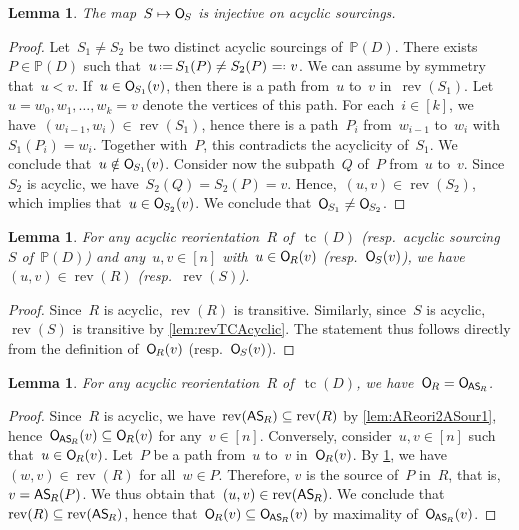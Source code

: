 \documentclass{amsart}
\newtheorem{lemma}[theorem]{Lemma}
\theoremstyle{definition}
\newcommand{\eqdef}{\mbox{\,\raisebox{0.2ex}{\scriptsize\ensuremath{\mathrm:}}\ensuremath{=}\,}} %
\newcommand{\defeq}{\mbox{~\ensuremath{=}\raisebox{0.2ex}{\scriptsize\ensuremath{\mathrm:}} }} %
\DeclareMathOperator{\tc}{tc} %
\newcommand{\mymap}[2]{\mathsf{#1}_{\hspace{-.7pt}#2}}
\newcommand{\orn}[1]{\mymap{O}{#1}}  %
\DeclareMathOperator{\rev}{rev} %
\newcommand{\asour}[1]{\mymap{AS}{#1}}  %
\newcommand{\PP}{\mathbb P} %
\begin{document}
\begin{lemma}
\label{lem:ASour2AOrn1}
The map~$S \mapsto \orn{S}$ is injective on acyclic sourcings.
\end{lemma}

\begin{proof}
Let~$S_1 \ne S_2$ be two distinct acyclic sourcings of~$\PP(D)$.
There exists~$P \in \PP(D)$ such that~$u \eqdef S_1(P) \ne S_2(P) \defeq v$.
We can assume by symmetry that~$u < v$.
If~$u \in \orn{S_1}(v)$, then there is a path from~$u$ to~$v$ in~$\rev(S_1)$.
Let~$u = w_0, w_1, \dots, w_k = v$ denote the vertices of this path.
For each~$i \in [k]$, we have~$(w_{i-1},w_i) \in \rev(S_1)$, hence there is a path~$P_i$ from~$w_{i-1}$ to~$w_i$ with~$S_1(P_i) = w_i$.
Together with~$P$, this contradicts the acyclicity of~$S_1$.
We conclude that~${u \notin \orn{S_1}(v)}$.
Consider now the subpath~$Q$ of~$P$ from~$u$ to~$v$.
Since~$S_2$ is acyclic, we have~$S_2(Q) = S_2(P) = v$.
Hence,~$(u,v) \in \rev(S_2)$, which implies that~$u \in \orn{S_2}(v)$.
We conclude that~$\orn{S_1} \ne \orn{S_2}$.
\end{proof}

\begin{lemma}
\label{lem:acyclicSimplifiesDef}
For any acyclic reorientation~$R$ of~$\tc(D)$ (resp.~acyclic sourcing~$S$ of~$\PP(D)$) and any~$u,v \in [n]$ with~$u \in \orn{R}(v)$ (resp.~$\orn{S}(v)$), we have~$(u,v) \in \rev(R)$ (resp.~$\rev(S)$).
\end{lemma}

\begin{proof}
Since~$R$ is acyclic, $\rev(R)$ is transitive.
Similarly, since~$S$ is acyclic, $\rev(S)$ is transitive by \cref{lem:revTCAcyclic}.
The statement thus follows directly from the definition of~$\orn{R}(v)$ (resp.~$\orn{S}(v)$).
\end{proof}

\begin{lemma}
\label{lem:AReori2ASour2AOrn}
For any acyclic reorientation~$R$ of~$\tc(D)$, we have~$\orn{R} = \orn{\asour{R}}$.
\end{lemma}

\begin{proof}
Since~$R$ is acyclic, we have~$\rev(\asour{R}) \subseteq \rev(R)$ by \cref{lem:AReori2ASour1}, hence~$\orn{\asour{R}}(v) \subseteq \orn{R}(v)$ for any~$v \in [n]$.
Conversely, consider~$u,v \in [n]$ such that~$u \in \orn{R}(v)$.
Let~$P$ be a path from~$u$ to~$v$ in~$\orn{R}(v)$.
By \cref{lem:acyclicSimplifiesDef}, we have~$(w,v) \in \rev(R)$ for all~$w \in P$.
Therefore, $v$ is the source of~$P$ in~$R$, that is, $v = \asour{R}(P)$.
We thus obtain that~$(u,v) \in \rev(\asour{R})$.
We conclude that~$\rev(R) \subseteq \rev(\asour{R})$, hence that~$\orn{R}(v) \subseteq \orn{\asour{R}}(v)$ by maximality of~$\orn{\asour{R}}(v)$.
\end{proof}
\end{document}
